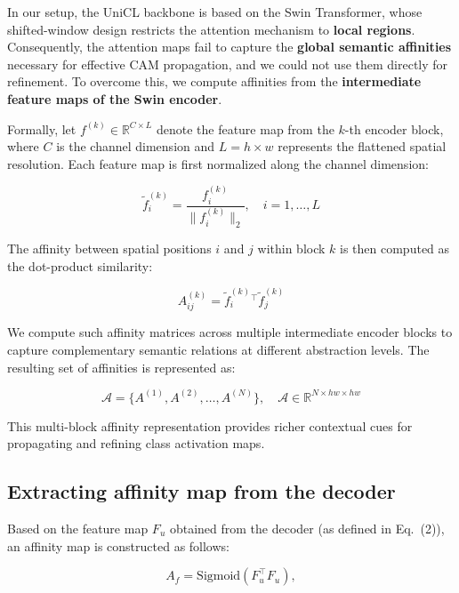 In our setup, the UniCL backbone is based on the Swin Transformer, whose shifted-window design restricts the attention mechanism to \textbf{local regions}. Consequently, the attention maps fail to capture the \textbf{global semantic affinities} necessary for effective CAM propagation, and we could not use them directly for refinement. To overcome this, we compute affinities from the \textbf{intermediate feature maps of the Swin encoder}.  

Formally, let $f^{(k)} \in \mathbb{R}^{C \times L}$ denote the feature map from the $k$-th encoder block, where $C$ is the channel dimension and $L = h \times w$ represents the flattened spatial resolution. Each feature map is first normalized along the channel dimension:

\begin{equation}
\tilde{f}^{(k)}_i = \frac{f^{(k)}_i}{\| f^{(k)}_i \|_2}, \quad i = 1, \dots, L
\end{equation}

The affinity between spatial positions $i$ and $j$ within block $k$ is then computed as the dot-product similarity:

\begin{equation}
A^{(k)}_{ij} = \tilde{f}^{(k)}_i{}^\top \tilde{f}^{(k)}_j
\end{equation}

We compute such affinity matrices across multiple intermediate encoder blocks to capture complementary semantic relations at different abstraction levels. The resulting set of affinities is represented as:

\begin{equation}
\mathcal{A} = \{ A^{(1)}, A^{(2)}, \dots, A^{(N)} \}, \quad \mathcal{A} \in \mathbb{R}^{N \times hw \times hw}
\end{equation}

This multi-block affinity representation provides richer contextual cues for propagating and refining class activation maps.


\subsection{Extracting affinity map from the decoder}
\label{subsec:decoder_aff_mat}
Based on the feature map $F_u$ obtained from the decoder (as defined in Eq.~(2)), an affinity map is constructed as follows:

\begin{equation}
    \label{eq: A_f}
    A_f = \text{Sigmoid}(F_u^\top F_u),
\end{equation}

